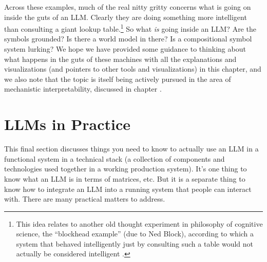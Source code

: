Across these examples, much of the real nitty gritty concerns what is going on
inside the guts of an LLM. Clearly they are doing something more intelligent
than consulting a giant lookup table.\footnote{This idea relates to another old
thought experiment in philosophy of cognitive science, the ``blockhead example''
(due to Ned Block), according to which a system that behaved intelligently just
by consulting such a table would not actually be considered intelligent
\cite{milliere2024philosophical1}.} So what \emph{is} going inside an LLM? Are
the symbols grounded? Is there a world model in there? Is a compositional
symbol system lurking?  We hope we have provided some guidance to thinking
about what happens in the guts of these machines with all the explanations and
visualizations (and pointers to other tools and visualizations) in this
chapter, and we also note that the topic is itself being actively pursued in
the area of mechanistic interpretability, discussed in chapter
. 


\section{LLMs in Practice}\label{transformersInPractice}

This final section discusses things you need to know to actually use an LLM in
a functional system in a technical stack (a collection of components and
technologies used together in a working production system).  It's one thing to
know what an LLM is in terms of matrices, etc.  But it is a separate thing to
know how to integrate an LLM into a running system that people can interact
with.  There are many practical matters to address.

